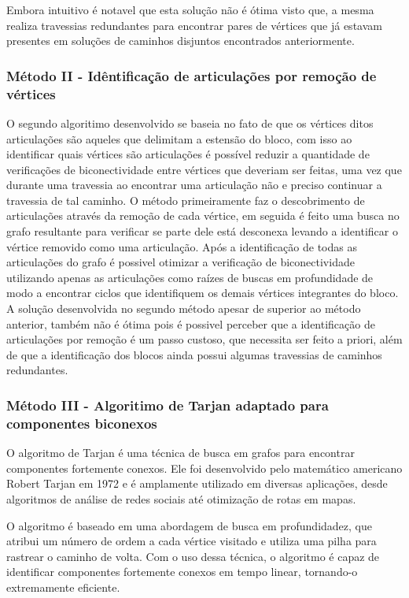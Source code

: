 Embora intuitivo é notavel que esta solução não é ótima visto que, a mesma realiza travessias redundantes para encontrar pares de vértices que já estavam presentes em soluções de caminhos disjuntos encontrados anteriormente.

\subsubsection{\esp Método II - Idêntificação de articulações por remoção de vértices}

O segundo algoritimo desenvolvido se baseia no fato de que os vértices ditos articulações são aqueles que delimitam a estensão do bloco, com isso ao identificar quais vértices são articulações é possível reduzir a quantidade de verificações de biconectividade entre vértices que deveriam ser feitas, uma vez que durante uma travessia ao encontrar uma articulação não e preciso continuar a travessia de tal caminho. 
O método primeiramente faz o descobrimento de articulações através da remoção de cada vértice, em seguida é feito uma busca no grafo resultante para verificar se parte dele está desconexa levando a identificar o vértice removido como uma articulação. Após a identificação de todas as articulações do grafo é possivel otimizar a verificação de biconectividade utilizando apenas as articulações como raízes de buscas em profundidade de modo a encontrar ciclos que identifiquem os demais vértices integrantes do bloco.
A solução desenvolvida no segundo método apesar de superior ao método anterior, também não é ótima pois é possivel perceber que a identificação de articulações por remoção é um passo custoso, que necessita ser feito a priori, além de que a identificação dos blocos ainda possui algumas travessias de caminhos redundantes.

\subsubsection{\esp Método III - Algoritimo de Tarjan adaptado para componentes biconexos}

O algoritmo de Tarjan é uma técnica de busca em grafos para encontrar componentes fortemente conexos. Ele foi desenvolvido pelo matemático americano Robert Tarjan em 1972 e é amplamente utilizado em diversas aplicações, desde algoritmos de análise de redes sociais até otimização de rotas em mapas.

O algoritmo é baseado em uma abordagem de busca em profundidadez, que atribui um número de ordem a cada vértice visitado e utiliza uma pilha para rastrear o caminho de volta. Com o uso dessa técnica, o algoritmo é capaz de identificar componentes fortemente conexos em tempo linear, tornando-o extremamente eficiente.

